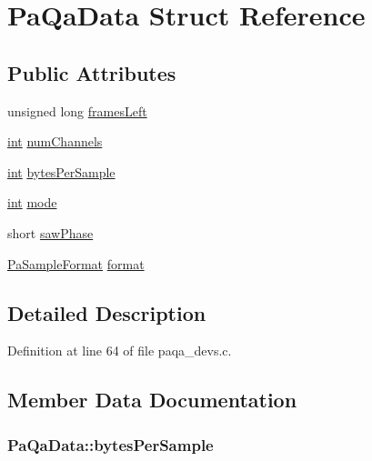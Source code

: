 \hypertarget{struct_pa_qa_data}{}\section{Pa\+Qa\+Data Struct Reference}
\label{struct_pa_qa_data}
\subsection*{Public Attributes}
\begin{DoxyCompactItemize}
\item 
unsigned long \hyperlink{struct_pa_qa_data_acafd715d7fe9865a0ed4ab9d9916b08d}{frames\+Left}
\item 
\hyperlink{xmltok_8h_a5a0d4a5641ce434f1d23533f2b2e6653}{int} \hyperlink{struct_pa_qa_data_a4ec905802e0ca3da56cd7307d06e7544}{num\+Channels}
\item 
\hyperlink{xmltok_8h_a5a0d4a5641ce434f1d23533f2b2e6653}{int} \hyperlink{struct_pa_qa_data_a1f9d1001d8f0fc45ab549beb055b6fce}{bytes\+Per\+Sample}
\item 
\hyperlink{xmltok_8h_a5a0d4a5641ce434f1d23533f2b2e6653}{int} \hyperlink{struct_pa_qa_data_aeb5c74d657257a149a4898e4fa122578}{mode}
\item 
short \hyperlink{struct_pa_qa_data_ae99f5e5b17b941185f1fe0b9bb31860a}{saw\+Phase}
\item 
\hyperlink{portaudio_8h_a4582d93c2c2e60e12be3d74c5fe00b96}{Pa\+Sample\+Format} \hyperlink{struct_pa_qa_data_a7cf2d968a7fd2249f7000451081303c2}{format}
\end{DoxyCompactItemize}


\subsection{Detailed Description}


Definition at line 64 of file paqa\+\_\+devs.\+c.



\subsection{Member Data Documentation}
\subsubsection[{\texorpdfstring{bytes\+Per\+Sample}{bytesPerSample}}]{ Pa\+Qa\+Data\+::bytes\+Per\+Sample}\hypertarget{struct_pa_qa_data_a1f9d1001d8f0fc45ab549beb055b6fce}{}\label{struct_pa_qa_data_a1f9d1001d8f0fc45ab549beb055b6fce}


